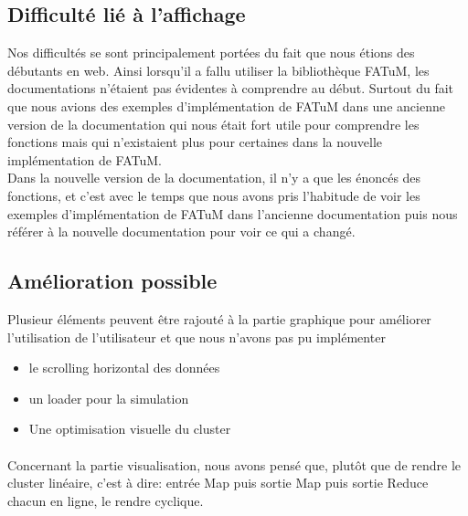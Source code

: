 \subsection{Difficulté lié à l'affichage}
Nos difficultés se sont principalement portées du fait que nous étions des débutants en web. Ainsi lorsqu'il a fallu utiliser la bibliothèque FATuM, les documentations n'étaient pas évidentes à comprendre au début. Surtout du fait que nous avions des exemples d'implémentation de FATuM dans une ancienne version de la documentation qui nous était fort utile pour comprendre les fonctions mais qui n'existaient plus pour certaines dans la nouvelle implémentation de FATuM.\\ 

Dans la nouvelle version de la documentation, il n'y a que les énoncés des fonctions, et c'est avec le temps que nous avons pris l'habitude de voir les exemples d'implémentation de FATuM dans l'ancienne documentation puis nous référer à la nouvelle documentation pour voir ce qui a changé.\\

\subsection{Amélioration possible}
Plusieur éléments peuvent être rajouté à la partie graphique pour améliorer l'utilisation de l'utilisateur et que nous n'avons pas pu implémenter
\begin{itemize}
\item le scrolling horizontal des données
\item un loader pour la simulation
\item Une optimisation visuelle du cluster
\end{itemize}


\paragraph{}
Concernant la partie visualisation, nous avons pensé que, plutôt que de rendre le cluster linéaire, c'est à dire: entrée Map puis sortie Map puis sortie Reduce chacun en ligne, le rendre cyclique.

